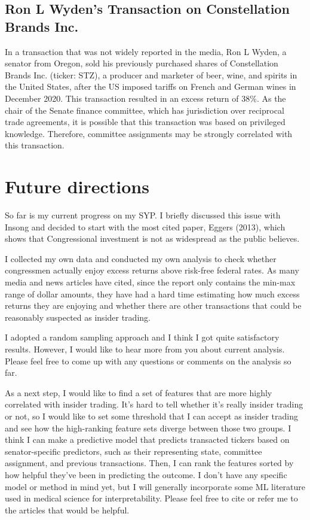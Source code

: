 \documentclass[12pt,letterpaper]{article}
\begin{document}
\subsection{Ron L Wyden's Transaction on Constellation Brands Inc.}

In a transaction that was not widely reported in the media, Ron L Wyden, a senator from Oregon, sold his previously purchased shares of Constellation Brands Inc. (ticker: STZ), a producer and marketer of beer, wine, and spirits in the United States, after the US imposed tariffs on French and German wines in December 2020. This transaction resulted in an excess return of 38\%. As the chair of the Senate finance committee, which has jurisdiction over reciprocal trade agreements, it is possible that this transaction was based on privileged knowledge. Therefore, committee assignments may be strongly correlated with this transaction.

\section{Future directions}
So far is my current progress on my SYP. I briefly discussed this issue with Insong and decided to start with the most cited paper, Eggers (2013), which shows that Congressional investment is not as widespread as the public believes.

I collected my own data and conducted my own analysis to check whether congressmen actually enjoy excess returns above risk-free federal rates. As many media and news articles have cited, since the report only contains the min-max range of dollar amounts, they have had a hard time estimating how much excess returns they are enjoying and whether there are other transactions that could be reasonably suspected as insider trading.

I adopted a random sampling approach and I think I got quite satisfactory results. However, I would like to hear more from you about current analysis. Please feel free to come up with any questions or comments on the analysis so far.

As a next step, I would like to find a set of features that are more highly correlated with insider trading. It's hard to tell whether it's really insider trading or not, so I would like to set some threshold that I can accept as insider trading and see how the high-ranking feature sets diverge between those two groups. I think I can make a predictive model that predicts transacted tickers based on senator-specific predictors, such as their representing state, committee assignment, and previous transactions. Then, I can rank the features sorted by how helpful they've been in predicting the outcome. I don't have any specific model or method in mind yet, but I will generally incorporate some ML literature used in medical science for interpretability. Please feel free to cite or refer me to the articles that would be helpful.
\end{document}
